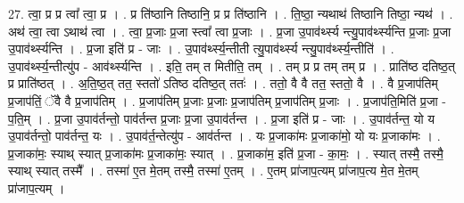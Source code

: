 \documentclass[17pt]{extarticle}
\begin{document}
27. त्वा॒ प्र प्र त्वा᳚ त्वा॒ प्र । . प्र ति॑ष्ठानि तिष्ठानि॒ प्र प्र ति॑ष्ठानि । . ति॒ष्ठा॒ न्यथाथ॑ तिष्ठानि तिष्ठा॒ न्यथ॑ । . अथ॑ त्वा॒ त्वा ऽथाथ॑ त्वा । . त्वा॒ प्र॒जाः प्र॒जा स्त्वा᳚ त्वा प्र॒जाः । . प्र॒जा उ॒पाव॑र्थ्स्य न्त्यु॒पाव॑र्थ्स्यन्ति प्र॒जाः प्र॒जा उ॒पाव॑र्थ्स्यन्ति । . प्र॒जा इति॑ प्र - जाः । . उ॒पाव॑र्थ्स्य॒न्तीती त्यु॒पाव॑र्थ्स्य न्त्यु॒पाव॑र्थ्स्य॒न्तीति॑ । . उ॒पाव॑र्थ्स्य॒न्तीत्यु॑प - आव॑र्थ्स्यन्ति । . इति॒ तम् त मितीति॒ तम् । . तम् प्र प्र तम् तम् प्र । . प्राति॑ष्ठ दतिष्ठ॒त् प्र प्राति॑ष्ठत् । . अ॒ति॒ष्ठ॒त् तत॒ स्ततो॑ ऽतिष्ठ दतिष्ठ॒त् ततः॑ । . ततो॒ वै वै तत॒ स्ततो॒ वै । . वै प्र॒जाप॑तिम् प्र॒जाप॑तिं॒ ॅवै वै प्र॒जाप॑तिम् । . प्र॒जाप॑तिम् प्र॒जाः प्र॒जाः प्र॒जाप॑तिम् प्र॒जाप॑तिम् प्र॒जाः । . प्र॒जाप॑ति॒मिति॑ प्र॒जा - प॒ति॒म् । . प्र॒जा उ॒पाव॑र्तन्तो॒ पाव॑र्तन्त प्र॒जाः प्र॒जा उ॒पाव॑र्तन्त । . प्र॒जा इति॑ प्र - जाः । . उ॒पाव॑र्तन्त॒ यो य उ॒पाव॑र्तन्तो॒ पाव॑र्तन्त॒ यः । . उ॒पाव॑र्त॒न्तेत्यु॑प - आव॑र्तन्त । . यः प्र॒जाका॑मः प्र॒जाका॑मो॒ यो यः प्र॒जाका॑मः । . प्र॒जाका॑मः॒ स्याथ् स्यात् प्र॒जाका॑मः प्र॒जाका॑मः॒ स्यात् । . प्र॒जाका॑म॒ इति॑ प्र॒जा - का॒मः॒ । . स्यात् तस्मै॒ तस्मै॒ स्याथ् स्यात् तस्मै᳚ । . तस्मा॑ ए॒त मे॒तम् तस्मै॒ तस्मा॑ ए॒तम् । . ए॒तम् प्रा॑जाप॒त्यम् प्रा॑जाप॒त्य मे॒त मे॒तम् प्रा॑जाप॒त्यम् । \newline
\end{document}
